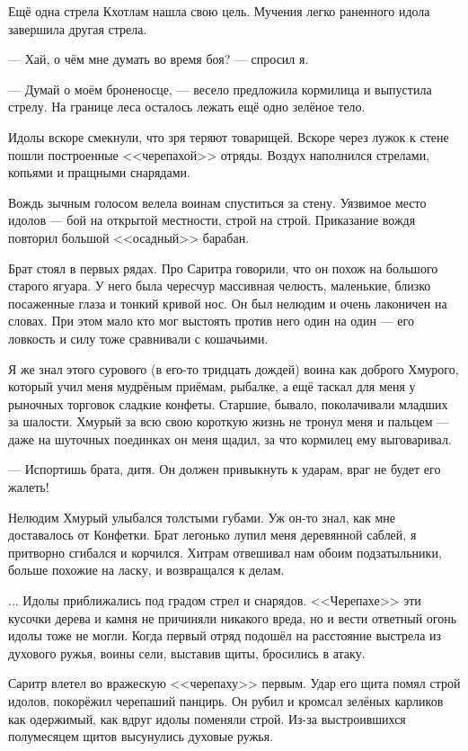 Ещё одна стрела Кхотлам нашла свою цель.
Мучения легко раненного идола завершила другая стрела.

--- Хай, о чём мне думать во время боя? --- спросил я.

--- Думай о моём броненосце, --- весело предложила кормилица и выпустила стрелу.
На границе леса осталось лежать ещё одно зелёное тело.

Идолы вскоре смекнули, что зря теряют товарищей.
Вскоре через лужок к стене пошли построенные <<черепахой>> отряды.
Воздух наполнился стрелами, копьями и пращными снарядами.

Вождь зычным голосом велела воинам спуститься за стену.
Уязвимое место идолов --- бой на открытой местности, строй на строй.
Приказание вождя повторил большой <<осадный>> барабан.

Брат стоял в первых рядах.
Про Саритра говорили, что он похож на большого старого ягуара.
У него была чересчур массивная челюсть, маленькие, близко посаженные глаза и тонкий кривой нос.
Он был нелюдим и очень лаконичен на словах.
При этом мало кто мог выстоять против него один на один --- его ловкость и силу тоже сравнивали с кошачьими.

Я же знал этого сурового (в его-то тридцать дождей) воина как доброго Хмурого, который учил меня мудрёным приёмам, рыбалке, а ещё таскал для меня у рыночных торговок сладкие конфеты.
Старшие, бывало, поколачивали младших за шалости.
Хмурый за всю свою короткую жизнь не тронул меня и пальцем --- даже на шуточных поединках он меня щадил, за что кормилец ему выговаривал.

--- Испортишь брата, дитя.
Он должен привыкнуть к ударам, враг не будет его жалеть!

Нелюдим Хмурый улыбался толстыми губами.
Уж он-то знал, как мне доставалось от Конфетки.
Брат легонько лупил меня деревянной саблей, я притворно сгибался и корчился.
Хитрам отвешивал нам обоим подзатыльники, больше похожие на ласку, и возвращался к делам.

... Идолы приближались под градом стрел и снарядов.
<<Черепахе>> эти кусочки дерева и камня не причиняли никакого вреда, но и вести ответный огонь идолы тоже не могли.
Когда первый отряд подошёл на расстояние выстрела из духового ружья, воины сели, выставив щиты, бросились в атаку.

Саритр влетел во вражескую <<черепаху>> первым.
Удар его щита помял строй идолов, покорёжил черепаший панцирь.
Он рубил и кромсал зелёных карликов как одержимый, как вдруг идолы поменяли строй.
Из-за выстроившихся полумесяцем щитов высунулись духовые ружья.


